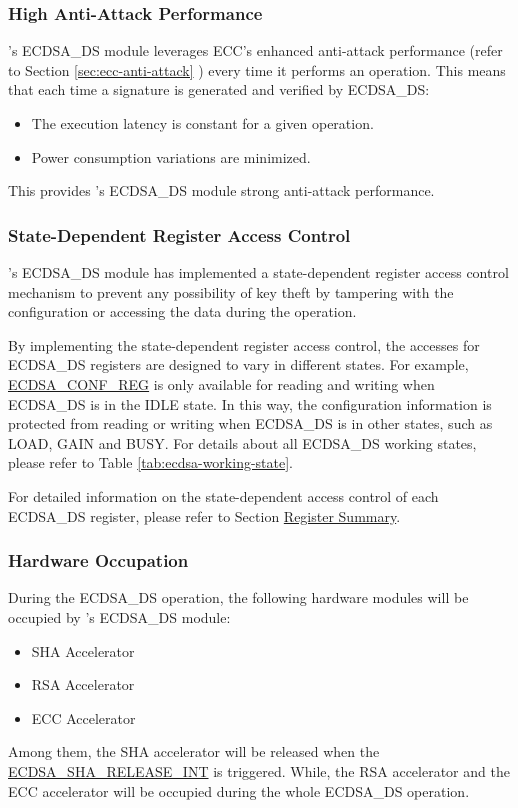 \documentclass[main\_\_EN.tex]{subfiles}
\begin{document}
\subsubsection{High Anti-Attack Performance}\label{sec:ecdsa-anti-attack}

\chipseries{}'s ECDSA\_DS module leverages ECC's enhanced anti-attack performance (refer to Section \ref{sec:ecc-anti-attack} \textit{}) every time it performs an operation. This means that each time a signature is generated and verified by ECDSA\_DS:

\begin{itemize}
    \item The execution latency is constant for a given operation.
    \item Power consumption variations are minimized.
\end{itemize}

This provides \chipseries{}'s ECDSA\_DS module strong anti-attack performance.

\subsubsection{State-Dependent Register Access Control}

\chipseries{}'s ECDSA\_DS module has implemented a state-dependent register access control mechanism to prevent any possibility of key theft by tampering with the configuration or accessing the data during the operation.

By implementing the state-dependent register access control, the accesses for ECDSA\_DS registers are designed to vary in different states. For example, \hyperref[regdesc:ECDSACONFREG]{ECDSA\_CONF\_REG} is only available for reading and writing when ECDSA\_DS is in the IDLE state. In this way, the configuration information is protected from reading or writing when ECDSA\_DS is in other states, such as LOAD, GAIN and BUSY. For details about all ECDSA\_DS working states, please refer to Table \ref{tab:ecdsa-working-state}.

For detailed information on the state-dependent access control of each ECDSA\_DS register, please refer to Section \hyperref[sec:ecdsa-reg-summ]{Register Summary}.

\subsubsection{Hardware Occupation}

During the ECDSA\_DS operation, the following hardware modules will be occupied by \chipname{}'s ECDSA\_DS module:
\begin{itemize}
    \item SHA Accelerator
    \item RSA Accelerator
    \item ECC Accelerator
\end{itemize}
Among them, the SHA accelerator will be released when the \hyperref[int:ECDSASHARELEASEINT]{ECDSA\_SHA\_RELEASE\_INT} is triggered. While, the RSA accelerator and the ECC accelerator will be occupied during the whole ECDSA\_DS operation.
\end{document}
